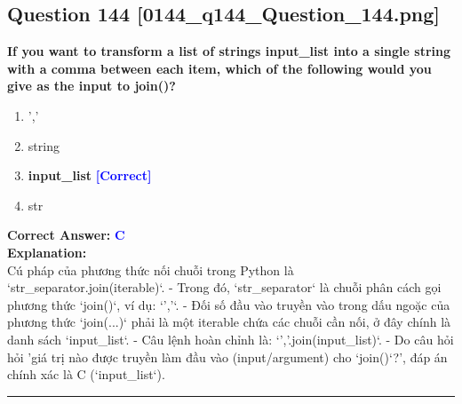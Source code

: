 \documentclass[11pt,a4paper]{article}
\begin{document}
\begin{minipage}{\textwidth}
\subsection*{Question 144 \quad \footnotesize{[0144_q144_Question_144.png]}}
\noindent \textbf{If you want to transform a list of strings input_list into a single string with a comma between each item, which of the following would you give as the input to join()?}

\begin{enumerate}[label=\Alph*.]
    \item ','
    \item string
    \item \textbf{input_list} \hfill \textcolor{blue}{\textbf{[Correct]}}
    \item str
\end{enumerate}

\noindent \textbf{Correct Answer:} \textcolor{blue}{\textbf{C}} \\[4pt]
\noindent \textbf{Explanation:}\\
Cú pháp của phương thức nối chuỗi trong Python là `str_separator.join(iterable)`.\newline
- Trong đó, `str_separator` là chuỗi phân cách gọi phương thức `join()`, ví dụ: `','`.\newline
- Đối số đầu vào truyền vào trong dấu ngoặc của phương thức `join(...)` phải là một iterable chứa các chuỗi cần nối, ở đây chính là danh sách `input_list`.\newline
- Câu lệnh hoàn chỉnh là: `','.join(input_list)`.\newline
- Do câu hỏi hỏi 'giá trị nào được truyền làm đầu vào (input/argument) cho `join()`?', đáp án chính xác là C (`input_list`).
\end{minipage}
\vspace{0.8cm}
\hrule
\vspace{0.5cm}
\end{document}
